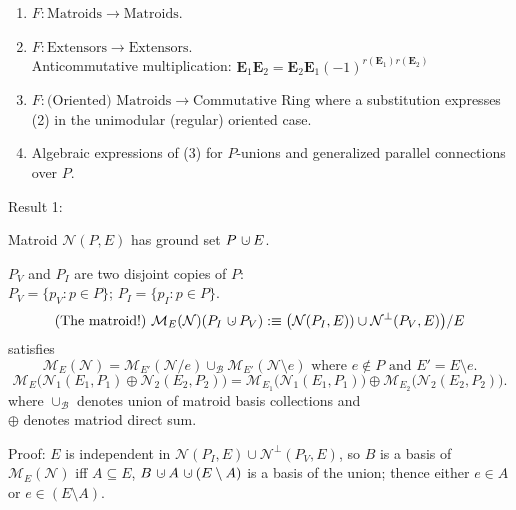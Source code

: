 \documentclass[%
  slidesonly,%
  semlayer,%
  amsmath
  ]{seminar}                                  %
\newcommand{\dunion}
{\mbox{\hbox{\hskip6pt$\cdot$\hskip-5.50pt$\cup$\hskip2pt}}}
\begin{document}
\begin{slide}
\begin{enumerate}
\item $F:\mbox{Matroids}\rightarrow\mbox{Matroids}$.
\item $F:\mbox{Extensors}\rightarrow\mbox{Extensors}$.\\
Anticommutative multiplication: 
$\mathbf{E}_1\mathbf{E}_2=\mathbf{E}_2\mathbf{E}_1(-1)^{r(\mathbf{E}_1)r(\mathbf{E}_2)}$
\item $F:\mbox{(Oriented) Matroids}\rightarrow\mbox{Commutative Ring}$ where 
a substitution expresses (2) in the unimodular (regular) oriented case.
\item Algebraic expressions of (3) for $P$-unions and generalized parallel
connections over $P$.
\end{enumerate}
\end{slide}

\begin{slide}
Result 1:

Matroid $\mathcal{N}(P,E)$ has ground set $P\dunion E$.

$P_V$ and $P_I$ are two disjoint copies of $P$:\\
$P_V=\{p_V: p\in P\}$; $P_I=\{p_I: p\in P\}$.
\[
\text{(The matroid!)\ }\mathcal{M}_E(\mathcal{N})(P_I\dunion P_V)
:\equiv \big(\mathcal{N}(P_I,E))\cup\mathcal{N}^{\perp}(P_V,E)\big)/E
\]
satisfies
\begin{equation}
\mathcal{M}_E(\mathcal{N}) = \mathcal{M}_{E'}(\mathcal{N}/ e) \cup_{\mathcal{B}}
\mathcal{M}_{E'}(\mathcal{N}\setminus e)\text{ where }e\not\in P\text{ and }E'=E\setminus e.
\end{equation}
\begin{equation}
\mathcal{M}_{E}\big(\mathcal{N}_1(E_1,P_1)\oplus\mathcal{N}_2(E_2,P_2)\big)=
\mathcal{M}_{E_1}\big(\mathcal{N}_1(E_1,P_1)\big)\oplus
\mathcal{M}_{E_2}\big(\mathcal{N}_2(E_2,P_2)\big).
\end{equation}
where $\cup_{\mathcal{B}}$ denotes union of matroid basis collections and \\
$\oplus$ denotes matriod direct sum.

Proof:  $E$ is independent in $\mathcal{N}(P_I,E)\cup\mathcal{N}^{\perp}(P_V,E)$, so
$B$ is a basis of $\mathcal{M}_E(\mathcal{N})$ iff $A\subseteq E$, 
$B\dunion A \dunion (E\setminus A)$ is a basis of the union; thence either $e\in A$ or $e\in (E\setminus A)$.
\end{slide}
\end{document}
